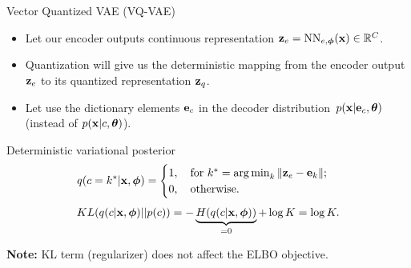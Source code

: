 \begin{frame}{Vector Quantized VAE (VQ-VAE)}
	\begin{itemize}
		\item Let our encoder outputs continuous representation $\mathbf{z}_e = \text{NN}_{e, \boldsymbol{\phi}}(\mathbf{x}) \in \mathbb{R}^{C}$.
		\item Quantization will give us the deterministic mapping from the encoder output $\mathbf{z}_e$ to its quantized representation $\mathbf{z}_q$.
		\item Let use the dictionary elements $\mathbf{e}_c$ in the decoder distribution~$p(\mathbf{x} | \mathbf{e}_c, \boldsymbol{\theta})$ (instead of $p(\mathbf{x} | c, \boldsymbol{\theta})$).
	\end{itemize}
	\begin{block}{Deterministic variational posterior}
		\vspace{-0.3cm}
		\[
			q(c = k^* | \mathbf{x}, \boldsymbol{\phi}) = \begin{cases}
				1 , \quad \text{for } k^* = \operatorname*{arg\,min}_k \| \mathbf{z}_e - \mathbf{e}_k \|; \\
				0, \quad \text{otherwise}.
		\end{cases}
		\]
		\[
			KL(q(c | \mathbf{x}, \boldsymbol{\phi}) || p(c)) = - \underbrace{H(q(c | \mathbf{x}, \boldsymbol{\phi}))}_{=0} + \log K = \log K. 
		\]
	\end{block}	
	\vspace{-0.4cm}
	\textbf{Note:} KL term (regularizer) does not affect the ELBO objective.
\end{frame}

